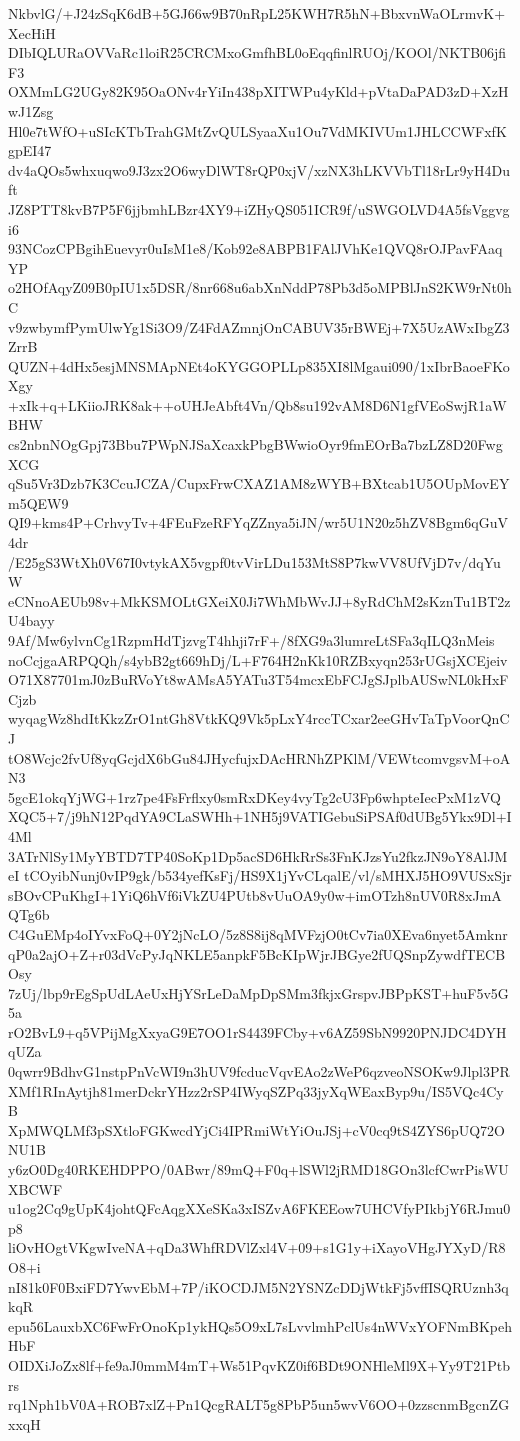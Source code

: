 NkbvlG/+J24zSqK6dB+5GJ66w9B70nRpL25KWH7R5hN+BbxvnWaOLrmvK+XecHiH
DIbIQLURaOVVaRc1loiR25CRCMxoGmfhBL0oEqqfinlRUOj/KOOl/NKTB06jfiF3
OXMmLG2UGy82K95OaONv4rYiIn438pXITWPu4yKld+pVtaDaPAD3zD+XzHwJ1Zsg
Hl0e7tWfO+uSIcKTbTrahGMtZvQULSyaaXu1Ou7VdMKIVUm1JHLCCWFxfKgpEI47
dv4aQOs5whxuqwo9J3zx2O6wyDlWT8rQP0xjV/xzNX3hLKVVbTl18rLr9yH4Duft
JZ8PTT8kvB7P5F6jjbmhLBzr4XY9+iZHyQS051ICR9f/uSWGOLVD4A5fsVggvgi6
93NCozCPBgihEuevyr0uIsM1e8/Kob92e8ABPB1FAlJVhKe1QVQ8rOJPavFAaqYP
o2HOfAqyZ09B0pIU1x5DSR/8nr668u6abXnNddP78Pb3d5oMPBlJnS2KW9rNt0hC
v9zwbymfPymUlwYg1Si3O9/Z4FdAZmnjOnCABUV35rBWEj+7X5UzAWxIbgZ3ZrrB
QUZN+4dHx5esjMNSMApNEt4oKYGGOPLLp835XI8lMgaui090/1xIbrBaoeFKoXgy
+xIk+q+LKiioJRK8ak++oUHJeAbft4Vn/Qb8su192vAM8D6N1gfVEoSwjR1aWBHW
cs2nbnNOgGpj73Bbu7PWpNJSaXcaxkPbgBWwioOyr9fmEOrBa7bzLZ8D20FwgXCG
qSu5Vr3Dzb7K3CcuJCZA/CupxFrwCXAZ1AM8zWYB+BXtcab1U5OUpMovEYm5QEW9
QI9+kms4P+CrhvyTv+4FEuFzeRFYqZZnya5iJN/wr5U1N20z5hZV8Bgm6qGuV4dr
/E25gS3WtXh0V67I0vtykAX5vgpf0tvVirLDu153MtS8P7kwVV8UfVjD7v/dqYuW
eCNnoAEUb98v+MkKSMOLtGXeiX0Ji7WhMbWvJJ+8yRdChM2sKznTu1BT2zU4bayy
9Af/Mw6ylvnCg1RzpmHdTjzvgT4hhji7rF+/8fXG9a3lumreLtSFa3qILQ3nMeis
noCcjgaARPQQh/s4ybB2gt669hDj/L+F764H2nKk10RZBxyqn253rUGsjXCEjeiv
O71X87701mJ0zBuRVoYt8wAMsA5YATu3T54mcxEbFCJgSJplbAUSwNL0kHxFCjzb
wyqagWz8hdItKkzZrO1ntGh8VtkKQ9Vk5pLxY4rccTCxar2eeGHvTaTpVoorQnCJ
tO8Wcjc2fvUf8yqGcjdX6bGu84JHycfujxDAcHRNhZPKlM/VEWtcomvgsvM+oAN3
5gcE1okqYjWG+1rz7pe4FsFrflxy0smRxDKey4vyTg2cU3Fp6whpteIecPxM1zVQ
XQC5+7/j9hN12PqdYA9CLaSWHh+1NH5j9VATIGebuSiPSAf0dUBg5Ykx9Dl+I4Ml
3ATrNlSy1MyYBTD7TP40SoKp1Dp5acSD6HkRrSs3FnKJzsYu2fkzJN9oY8AlJMeI
tCOyibNunj0vIP9gk/b534yefKsFj/HS9X1jYvCLqalE/vl/sMHXJ5HO9VUSxSjr
sBOvCPuKhgI+1YiQ6hVf6iVkZU4PUtb8vUuOA9y0w+imOTzh8nUV0R8xJmAQTg6b
C4GuEMp4oIYvxFoQ+0Y2jNcLO/5z8S8ij8qMVFzjO0tCv7ia0XEva6nyet5Amknr
qP0a2ajO+Z+r03dVcPyJqNKLE5anpkF5BcKIpWjrJBGye2fUQSnpZywdfTECBOsy
7zUj/lbp9rEgSpUdLAeUxHjYSrLeDaMpDpSMm3fkjxGrspvJBPpKST+huF5v5G5a
rO2BvL9+q5VPijMgXxyaG9E7OO1rS4439FCby+v6AZ59SbN9920PNJDC4DYHqUZa
0qwrr9BdhvG1nstpPnVcWI9n3hUV9fcducVqvEAo2zWeP6qzveoNSOKw9Jlpl3PR
XMf1RInAytjh81merDckrYHzz2rSP4IWyqSZPq33jyXqWEaxByp9u/IS5VQc4CyB
XpMWQLMf3pSXtloFGKwcdYjCi4IPRmiWtYiOuJSj+cV0cq9tS4ZYS6pUQ72ONU1B
y6zO0Dg40RKEHDPPO/0ABwr/89mQ+F0q+lSWl2jRMD18GOn3lcfCwrPisWUXBCWF
u1og2Cq9gUpK4johtQFcAqgXXeSKa3xISZvA6FKEEow7UHCVfyPIkbjY6RJmu0p8
liOvHOgtVKgwIveNA+qDa3WhfRDVlZxl4V+09+s1G1y+iXayoVHgJYXyD/R8O8+i
nI81k0F0BxiFD7YwvEbM+7P/iKOCDJM5N2YSNZcDDjWtkFj5vffISQRUznh3qkqR
epu56LauxbXC6FwFrOnoKp1ykHQs5O9xL7sLvvlmhPclUs4nWVxYOFNmBKpehHbF
OIDXiJoZx8lf+fe9aJ0mmM4mT+Ws51PqvKZ0if6BDt9ONHleMl9X+Yy9T21Ptbrs
rq1Nph1bV0A+ROB7xlZ+Pn1QcgRALT5g8PbP5un5wvV6OO+0zzscnmBgcnZGxxqH
